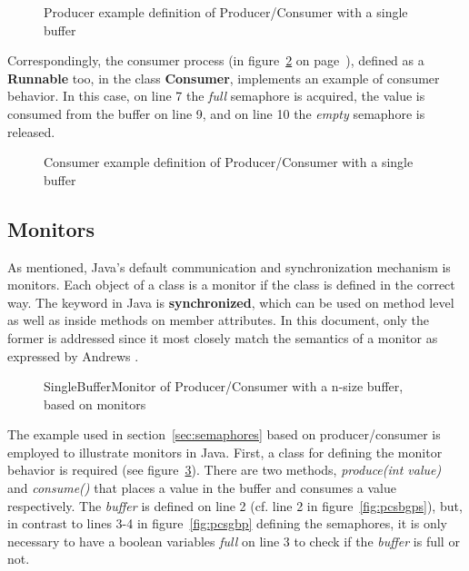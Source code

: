 \documentclass[11pt]{article} %
\begin{document}
\begin{figure}[h]

\caption{Producer example definition of Producer/Consumer with a single buffer}
\label{fig:pcsbproc}
\end{figure}

Correspondingly, the consumer process (in figure~\ref{fig:pcsbcons} on page~\pageref{fig:pcsbcons}), defined as a {\bfseries Runnable} too, in the class {\bfseries Consumer}, implements an example of consumer behavior. In this case, on line 7 the \emph{full} semaphore is acquired, the value is consumed from the buffer on line 9, and on line 10 the \emph{empty} semaphore is released. 

\begin{figure}[h]

\caption{Consumer example definition of Producer/Consumer with a single buffer}
\label{fig:pcsbcons}
\end{figure}

\subsection{Monitors}

As mentioned, Java's default communication and synchronization mechanism is monitors. Each object of a class is a monitor if the class is defined in the correct way. The keyword in Java is {\bfseries synchronized}, which can be used on method level as well as inside methods on member attributes. In this document, only the former is addressed since it most closely match the semantics of a monitor as expressed by Andrews \cite[ch. 5]{andrews_foundations_2000}. 

\lstset{inputpath=c:/git/IT325G/IT325G/examples/se/his/iit/it325g/examples/monitors/multipleProducerConsumerSingleBuffer}
\begin{figure}[ht]

\caption{SingleBufferMonitor of Producer/Consumer with a n-size buffer, based on monitors}
\label{fig:pcsbsbm-monitor}
\end{figure}

The example used in section~\ref{sec:semaphores} based on producer/consumer is employed to illustrate monitors in Java. First, a class for defining the monitor behavior is required (see figure~\ref{fig:pcsbsbm-monitor}). There are two methods, \emph{produce(int value)} and \emph{consume()} that places a value in the buffer and consumes a value respectively. The \emph{buffer} is defined on line 2 (cf. line 2 in figure~\ref{fig:pcsbgps}), but, in contrast to lines 3-4 in figure~\ref{fig:pcsgbp} defining the semaphores, it is only necessary to have a boolean variables \emph{full} on line 3 to check if the \emph{buffer} is full or not. 
\end{document}
